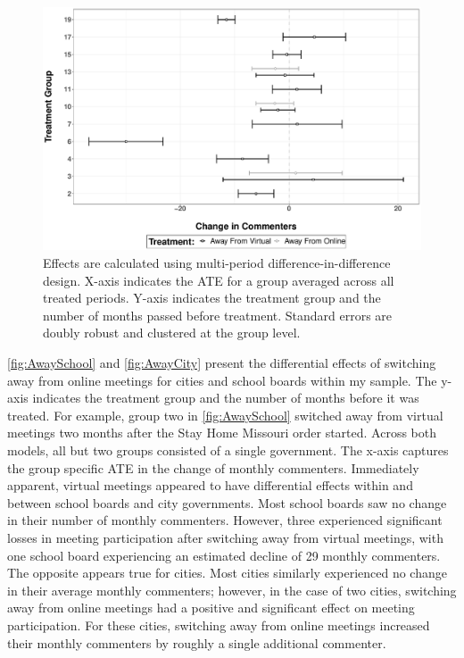     \begin{figure}[H]
        \centering
         \par\medskip
        \includegraphics[scale=0.39]{Figures/SchoolMPDID.pdf}
        \caption[Effect of Switching Away From Accessible Meetings By School Board Groups]{\footnotesize{Effects are calculated using multi-period difference-in-difference design. X-axis indicates the ATE for a group averaged across all treated periods. Y-axis indicates the treatment group and the number of months passed before treatment. Standard errors are doubly robust and clustered at the group level.}}
        \label{fig:AwaySchool}
    \end{figure}

    \autoref{fig:AwaySchool} and \autoref{fig:AwayCity} present the differential effects of switching away from online meetings for cities and school boards within my sample. The y-axis indicates the treatment group and the number of months before it was treated. For example, group two in \autoref{fig:AwaySchool} switched away from virtual meetings two months after the Stay Home Missouri order started. Across both models, all but two groups consisted of a single government. The x-axis captures the group specific ATE in the change of monthly commenters. Immediately apparent, virtual meetings appeared to have differential effects within and between school boards and city governments. Most school boards saw no change in their number of monthly commenters. However, three experienced significant losses in meeting participation after switching away from virtual meetings, with one school board experiencing an estimated decline of 29 monthly commenters. The opposite appears true for cities. Most cities similarly experienced no change in their average monthly commenters; however, in the case of two cities, switching away from online meetings had a positive and significant effect on meeting participation. For these cities, switching away from online meetings increased their monthly commenters by roughly a single additional commenter.

